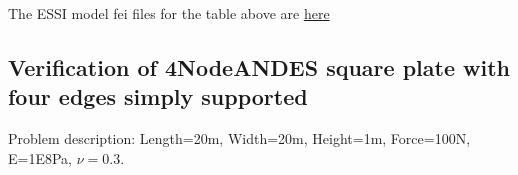 \documentclass[fleqn,11pt]{article}
\begin{document}
The ESSI model fei files for the table above are \href{https://github.com/yuan-energy/ESSI_Verification/blob/master/4NodeANDES/square_plate_clamped/square_plate_clamped.tar.gz?raw=true}{here}




























\newpage
\subsection{Verification of 4NodeANDES square plate with four edges simply supported}

Problem description: Length=20m, Width=20m, Height=1m, Force=100N, E=1E8Pa, $\nu=0.3$. 
\end{document}
